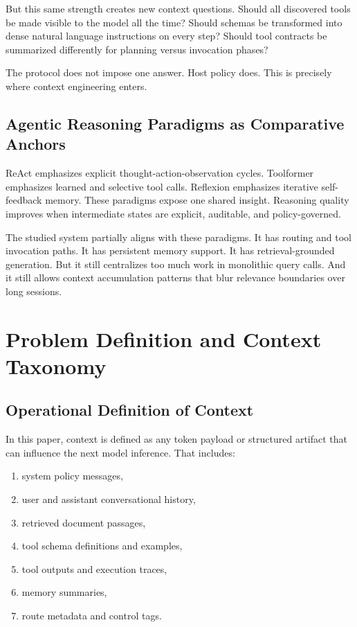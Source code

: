 \documentclass[conference]{IEEEtran}
\begin{document}
But this same strength creates new context questions.
Should all discovered tools be made visible to the model all the time?
Should schemas be transformed into dense natural language instructions on every step?
Should tool contracts be summarized differently for planning versus invocation phases?

The protocol does not impose one answer.
Host policy does.
This is precisely where context engineering enters.

\subsection{Agentic Reasoning Paradigms as Comparative Anchors}

ReAct emphasizes explicit thought-action-observation cycles.
Toolformer emphasizes learned and selective tool calls.
Reflexion emphasizes iterative self-feedback memory.
These paradigms expose one shared insight.
Reasoning quality improves when intermediate states are explicit, auditable, and policy-governed.

The studied system partially aligns with these paradigms.
It has routing and tool invocation paths.
It has persistent memory support.
It has retrieval-grounded generation.
But it still centralizes too much work in monolithic query calls.
And it still allows context accumulation patterns that blur relevance boundaries over long sessions.

\section{Problem Definition and Context Taxonomy}
\label{sec:taxonomy}

\subsection{Operational Definition of Context}

In this paper, context is defined as any token payload or structured artifact that can influence the next model inference.
That includes:

\begin{enumerate}[leftmargin=1.2em]
\item system policy messages,
\item user and assistant conversational history,
\item retrieved document passages,
\item tool schema definitions and examples,
\item tool outputs and execution traces,
\item memory summaries,
\item route metadata and control tags.
\end{enumerate}
\end{document}
